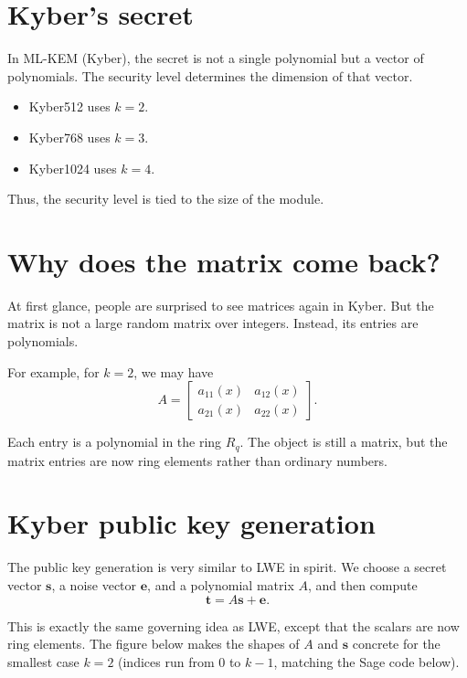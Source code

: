 \section{Kyber's secret}

In ML-KEM (Kyber), the secret is not a single polynomial but a vector of polynomials. The security level determines the dimension of that vector.

\begin{itemize}
    \item Kyber512 uses $k=2$.
    \item Kyber768 uses $k=3$.
    \item Kyber1024 uses $k=4$.
\end{itemize}

Thus, the security level is tied to the size of the module.

\section{Why does the matrix come back?}

At first glance, people are surprised to see matrices again in Kyber. But the matrix is not a large random matrix over integers. Instead, its entries are polynomials.

For example, for $k=2$, we may have
\[
A =
\begin{bmatrix}
 a_{11}(x) & a_{12}(x) \\
 a_{21}(x) & a_{22}(x)
\end{bmatrix}.
\]

Each entry is a polynomial in the ring $R_q$. The object is still a matrix, but the matrix entries are now ring elements rather than ordinary numbers.

\section{Kyber public key generation}

The public key generation is very similar to LWE in spirit. We choose a secret vector $\mathbf{s}$, a noise vector $\mathbf{e}$, and a polynomial matrix $A$, and then compute
\[
\mathbf{t} = A\mathbf{s} + \mathbf{e}.
\]

This is exactly the same governing idea as LWE, except that the scalars are now ring elements. The figure below makes the shapes of $A$ and $\mathbf{s}$ concrete for the smallest case $k=2$ (indices run from $0$ to $k-1$, matching the Sage code below).


